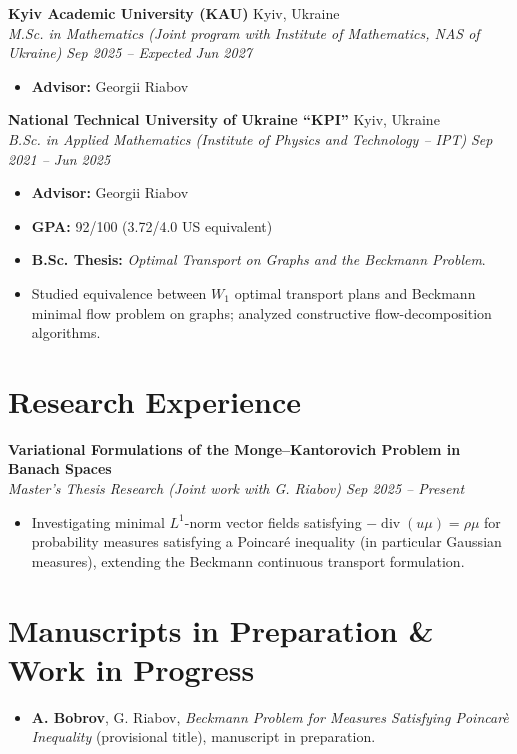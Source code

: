 \documentclass[10pt, a4paper]{article}
\newcommand{\entry}[4]{
  \noindent \textbf{#1} \hfill #2 \\
  \textit{#3} \hfill \textit{#4} \vspace{0.5pt}
}
\begin{document}
\entry{Kyiv Academic University (KAU)}{Kyiv, Ukraine}
{M.Sc. in Mathematics (Joint program with Institute of Mathematics, NAS of Ukraine)}{Sep 2025 -- Expected Jun 2027}
\begin{itemize}
    \item \textbf{Advisor:} Georgii Riabov
\end{itemize}

\entry{National Technical University of Ukraine ``KPI''}{Kyiv, Ukraine}
{B.Sc. in Applied Mathematics (Institute of Physics and Technology -- IPT)}{Sep 2021 -- Jun 2025}
\begin{itemize}
    \item \textbf{Advisor:} Georgii Riabov
    \item \textbf{GPA:} 92/100 (3.72/4.0 US equivalent)
    \item \textbf{B.Sc. Thesis:} \textit{Optimal Transport on Graphs and the Beckmann Problem}.
    \item Studied equivalence between $W_1$ optimal transport plans and Beckmann minimal flow problem on graphs;
        analyzed constructive flow-decomposition algorithms.
\end{itemize}

\section{Research Experience}

\noindent \textbf{Variational Formulations of the Monge--Kantorovich Problem in Banach Spaces} \\
\textit{Master's Thesis Research (Joint work with G. Riabov) \hfill Sep 2025 -- Present}
\begin{itemize}
    \item Investigating minimal $L^1$-norm vector fields satisfying $-\operatorname{div}(u\mu) = \rho\mu$ for probability measures satisfying a Poincaré inequality (in particular Gaussian measures), extending the Beckmann continuous transport formulation.
\end{itemize}

\section{Manuscripts in Preparation \& Work in Progress}

\begin{itemize}
    \item \textbf{A. Bobrov}, G. Riabov, \textit{Beckmann Problem for Measures
        Satisfying Poincarè Inequality}
        (provisional title), manuscript in preparation.
\end{itemize}
\end{document}

